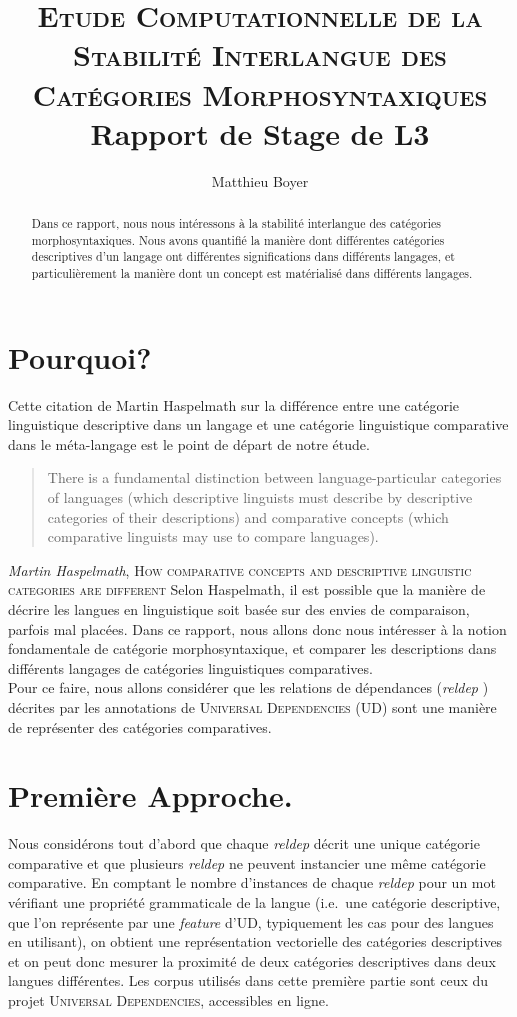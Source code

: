 \documentclass{cours}
\title{\textsc{Etude Computationnelle de la Stabilité Interlangue des Catégories Morphosyntaxiques}\\
{\small Rapport de Stage de L3} }
\author{Matthieu Boyer}
\begin{document}
    \begin{abstract}
        Dans ce rapport, nous nous intéressons à la stabilité interlangue des catégories morphosyntaxiques.
        Nous avons quantifié la manière dont différentes catégories descriptives d'un langage ont différentes
        significations dans différents langages,
        et particulièrement la manière dont un concept est matérialisé dans différents langages.
    \end{abstract}


    \section{Pourquoi?}\label{sec:Pourquoi?}
    Cette citation de Martin Haspelmath sur la différence entre une catégorie linguistique descriptive dans un langage et une catégorie linguistique comparative dans le méta-langage est le point de départ de notre étude.
    \begin{quote}
        There is a fundamental distinction between language-particular categories of languages (which descriptive
        linguists must describe by descriptive categories of their descriptions) and comparative concepts (which
        comparative linguists may use to compare languages).
    \end{quote}
    {\flushright
    {\textit{Martin Haspelmath}, \textsc{How comparative concepts and descriptive linguistic categories are different}}}
    Selon Haspelmath, il est possible que la manière de décrire les langues en linguistique soit basée sur des envies de comparaison, parfois mal placées.
    Dans ce rapport, nous allons donc nous intéresser à la notion fondamentale de catégorie morphosyntaxique, et
    comparer les descriptions dans différents langages de catégories linguistiques comparatives.\\
    Pour ce faire, nous allons considérer que les relations de dépendances (\textit{reldep}
    ) décrites par les annotations de \textsc{Universal Dependencies} (UD)
    sont une manière de représenter des catégories comparatives.


    \section{Première Approche.}\label{sec:premiere-approche.}
    Nous considérons tout d'abord que chaque \textit{reldep} décrit une unique catégorie comparative et que plusieurs \textit{reldep} ne peuvent instancier une même catégorie comparative.
    En comptant le nombre d'instances de chaque \textit{reldep} pour un mot vérifiant une propriété grammaticale de la langue (i.e.\ une catégorie descriptive, que l'on représente par une \textit{feature} d'UD, typiquement les cas pour des langues en utilisant), on obtient une représentation vectorielle des catégories descriptives et on peut donc mesurer la proximité de deux catégories descriptives dans deux langues différentes.
    Les corpus utilisés dans cette première partie sont ceux du projet \textsc{Universal Dependencies}, accessibles en ligne.
\end{document}
